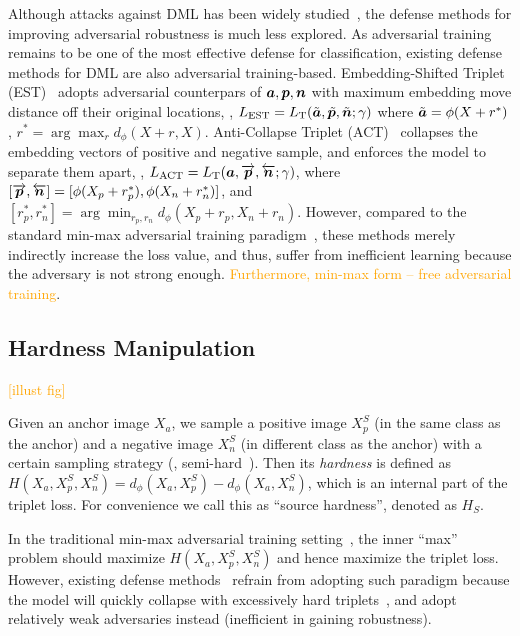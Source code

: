 \documentclass[10pt,twocolumn,letterpaper]{article}
\newcommand{\oo}[1]{\textcolor{orange}{#1}}
\begin{document}
Although attacks against DML has been widely studied~\cite{advrank,advorder},
the defense methods for improving adversarial robustness is much less explored.
%
As adversarial training~\cite{madry} remains to be one of the most effective
defense for classification, existing defense methods for DML are also
adversarial training-based.
%
Embedding-Shifted Triplet (EST)~\cite{advrank} adopts adversarial counterpars
of ${\bm{a}},{\bm{p}},{\bm{n}}$ with maximum embedding move distance off their original
locations, \ie,
$L_\text{EST}=L_\text{T}(\tilde{{\bm{a}}},\tilde{{\bm{p}}},\tilde{{\bm{n}}};\gamma)$ where
$\tilde{{\bm{a}}}=\phi(X+r^*)$, $r^*=\arg\max_{r}d_\phi(X+r, X)$.
%
Anti-Collapse Triplet (ACT)~\cite{robrank} collapses the embedding vectors of
positive and negative sample, and enforces the model to separate them apart,
\ie, $L_\text{ACT}=L_\text{T}({\bm{a}}, \overrightarrow{{\bm{p}}},
\overleftarrow{{\bm{n}}};\gamma)$, where $[\overrightarrow{{\bm{p}}},\overleftarrow{{\bm{n}}}]
=[\phi(X_p+r_p^*), \phi(X_n+r_n^*)]$, and $[r_p^*,r_n^*]=\arg\min_{r_p,r_n}
d_\phi(X_p+r_p, X_n+r_n)$.
%
However, compared to the standard min-max adversarial training
paradigm~\cite{madry}, these methods merely indirectly increase the loss value,
and thus, suffer from inefficient learning because the adversary is not strong
enough.
%
\oo{Furthermore, min-max form -- free adversarial training}.

\subsection{Hardness Manipulation}

\oo{[illust fig]}

Given an anchor image $X_a$, we sample a positive image $X_p^S$ (in the same
class as the anchor) and a negative image $X_n^S$ (in different class as the
anchor) with a certain sampling strategy (\eg, semi-hard~\cite{facenet}).
%
%
Then its \emph{hardness} is defined as
$H(X_a,X_p^S,X_n^S)=d_\phi(X_a,X_p^S)-d_\phi(X_a,X_n^S)$, which is an internal
part of the triplet loss.
%
For convenience we call this as ``source hardness'', denoted as $H_S$.

In the traditional min-max adversarial training setting~\cite{madry}, the inner
``max'' problem should maximize $H(X_a,X_p^S,X_n^S)$ and hence maximize the triplet
loss.
%
However, existing defense methods~\cite{advorder,robrank} refrain from adopting
such paradigm because the model will quickly collapse with excessively hard
triplets~\cite{facenet}, and adopt relatively weak adversaries instead
(inefficient in gaining robustness).
\end{document}
